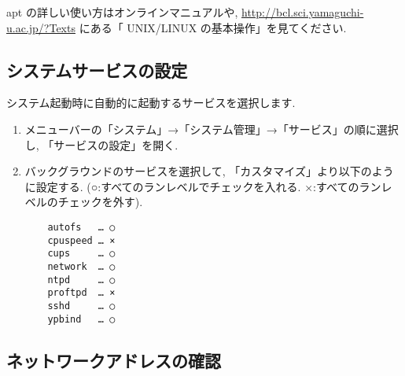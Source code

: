 \documentclass{jarticle}
\begin{document}
apt の詳しい使い方はオンラインマニュアルや,
\url{http://bcl.sci.yamaguchi-u.ac.jp/?Texts}
にある「 UNIX/LINUX の基本操作」を見てください.


\subsection{システムサービスの設定}\label{tab:SS}

システム起動時に自動的に起動するサービスを選択します.
\begin{enumerate}
	\item メニューバーの「システム」→「システム管理」→「サービス」の順に選択し,
	      「サービスの設定」を開く.
	\item バックグラウンドのサービスを選択して, 「カスタマイズ」より以下のように設定する.
	      (○:すべてのランレベルでチェックを入れる. ×:すべてのランレベルのチェックを外す).

\begin{verbatim}
    autofs   … ○
    cpuspeed … ×
    cups     … ○
    network  … ○
    ntpd     … ○
    proftpd  … ×
    sshd     … ○
    ypbind   … ○
\end{verbatim}


\end{enumerate}



\subsection{ネットワークアドレスの確認}
\end{document}
